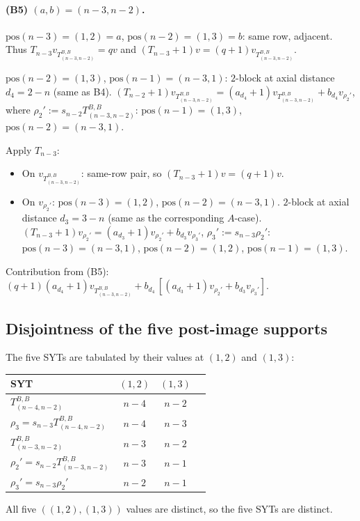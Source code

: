 \documentclass[11pt]{article}
\theoremstyle{definition}
\begin{document}
\paragraph{(B5) $(a, b) = (n{-}3, n{-}2)$.}
$\mathrm{pos}(n-3) = (1, 2) = a$, $\mathrm{pos}(n-2) = (1, 3) = b$:
same row, adjacent. Thus $T_{n-3} v_{T^{B,B}_{(n-3, n-2)}} = q v$
and $(T_{n-3}{+}1) v = (q+1) v_{T^{B,B}_{(n-3, n-2)}}$.

$\mathrm{pos}(n-2) = (1, 3)$, $\mathrm{pos}(n-1) = (n-3, 1)$:
$2$-block at axial distance $d_4 = 2-n$ (same as B4).
$(T_{n-2}{+}1) v_{T^{B,B}_{(n-3, n-2)}} = (a_{d_4}{+}1) v_{T^{B,B}_{(n-3, n-2)}}
+ b_{d_4} v_{\rho_2'}$, where
$\rho_2' := s_{n-2} T^{B,B}_{(n-3, n-2)}$: $\mathrm{pos}(n-1) = (1, 3)$,
$\mathrm{pos}(n-2) = (n-3, 1)$.

Apply $T_{n-3}$:
\begin{itemize}[leftmargin=2em,topsep=0.3em,itemsep=0.2em]
\item On $v_{T^{B,B}_{(n-3, n-2)}}$: same-row pair, so
$(T_{n-3}{+}1) v = (q+1) v$.
\item On $v_{\rho_2'}$: $\mathrm{pos}(n-3) = (1, 2)$,
$\mathrm{pos}(n-2) = (n-3, 1)$. $2$-block at axial distance
$d_3 = 3-n$ (same as the corresponding $A$-case).
$(T_{n-3}{+}1) v_{\rho_2'} = (a_{d_3}{+}1) v_{\rho_2'}
+ b_{d_3} v_{\rho_3'}$,
$\rho_3' := s_{n-3} \rho_2'$: $\mathrm{pos}(n-3) = (n-3, 1)$,
$\mathrm{pos}(n-2) = (1, 2)$, $\mathrm{pos}(n-1) = (1, 3)$.
\end{itemize}
Contribution from (B5): $(q+1)(a_{d_4}{+}1) v_{T^{B,B}_{(n-3, n-2)}}
+ b_{d_4}\,[(a_{d_3}{+}1) v_{\rho_2'} + b_{d_3} v_{\rho_3'}]$.

\subsection{Disjointness of the five post-image supports}

The five SYTs are tabulated by their values at $(1, 2)$ and $(1, 3)$:
\begin{center}
\begin{tabular}{lccc}
\toprule
SYT & $(1, 2)$ & $(1, 3)$ \\
\midrule
$T^{B,B}_{(n-4, n-2)}$ & $n-4$ & $n-2$ \\
$\rho_3 = s_{n-3} T^{B,B}_{(n-4, n-2)}$ & $n-4$ & $n-3$ \\
$T^{B,B}_{(n-3, n-2)}$ & $n-3$ & $n-2$ \\
$\rho_2' = s_{n-2} T^{B,B}_{(n-3, n-2)}$ & $n-3$ & $n-1$ \\
$\rho_3' = s_{n-3} \rho_2'$ & $n-2$ & $n-1$ \\
\bottomrule
\end{tabular}
\end{center}
All five $((1,2), (1,3))$ values are distinct, so the five SYTs
are distinct.
\end{document}
